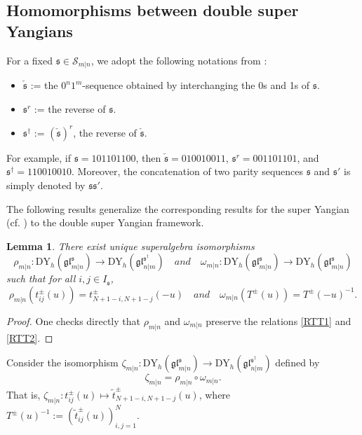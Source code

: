 \documentclass[a4paper,12pt]{article}
\newtheorem{lemm}[theo]{Lemma}
\numberwithin{equation}{section}
\begin{document}
\subsection{Homomorphisms between double super Yangians}

For a fixed $\mathfrak{s}\in\mathcal{S}_{m|n}$, we adopt the following notations from \cite{P16}:
\begin{itemize}
  \item $\check{\mathfrak{s}}$ := the $0^{n}1^{m}$-sequence obtained by interchanging the 0s and 1s of $\mathfrak{s}$.
  \item $\mathfrak{s}^{r}$ := the reverse of $\mathfrak{s}$.
  \item $\mathfrak{s}^{\dag}$ := $(\check{\mathfrak{s}})^{r}$, the reverse of $\check{\mathfrak{s}}$.
\end{itemize}
For example, if $\mathfrak{s}=101101100$, then $\check{\mathfrak{s}}=010010011$, $\mathfrak{s}^{r}=001101101$, and $\mathfrak{s}^{\dag}=110010010$. Moreover, the concatenation of two parity sequences $\mathfrak{s}$ and $\mathfrak{s}'$ is simply denoted by $\mathfrak{s}\mathfrak{s}'$.

The following results generalize the corresponding results for the super Yangian (cf. \cite{CH23, G07, P16}) to the double super Yangian framework.

\begin{lemm}\label{Hom 1}
There exist unique superalgebra isomorphisms
$$
\rho_{m|n}:\mathrm{DY}_{h}(\mathfrak{gl}_{m|n}^{\mathfrak{s}})\rightarrow\mathrm{DY}_{h}
(\mathfrak{gl}_{n|m}^{\mathfrak{s}^{\dag}}) \quad and \quad \omega_{m|n}:\mathrm{DY}_{h}(\mathfrak{gl}_{m|n}^{\mathfrak{s}})\rightarrow\mathrm{DY}_{h}
(\mathfrak{gl}_{m|n}^{\mathfrak{s}})
$$
such that for all $i,j\in I_{\mathfrak{s}}$, 
$$
\rho_{m|n}(t_{ij}^{\pm}(u))=t_{N+1-i,N+1-j}^{\pm}(-u)\quad and \quad
\omega_{m|n}(T^{\pm}(u))=T^{\pm}(-u)^{-1}.
$$
\end{lemm}
\begin{proof}
One checks directly that $\rho_{m|n}$ and $\omega_{m|n}$ preserve the relations \eqref{RTT1} and \eqref{RTT2}.
\end{proof}

Consider the isomorphism $\zeta_{m|n}:\mathrm{DY}_{h}(\mathfrak{gl}_{m|n}^{\mathfrak{s}})\rightarrow\mathrm{DY}_{h}
(\mathfrak{gl}_{n|m}^{\mathfrak{s}^{\dag}})$ defined by
$$
\zeta_{m|n}=\rho_{m|n}\circ\omega_{m|n}.
$$
That is, $\zeta_{m|n}: t_{ij}^{\pm}(u)\mapsto \tilde{t}_{N+1-i,N+1-j}^{\pm}(u)$, where $T^{\pm}(u)^{-1}:=
\left(\tilde{t}_{ij}^{\pm}(u)\right)_{i,j=1}^{N}.$
\end{document}
